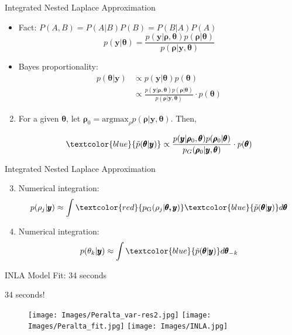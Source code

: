 \documentclass{beamer}
\begin{document}
\begin{frame}{Integrated Nested Laplace Approximation} {\citep{Rue2009}}
\begin{itemize}
\item Fact: $P(A,B) = P(A|B) P(B) = P(B|A) P(A)$
$$ p(\pmb{y} | \pmb{\theta}) = \frac{p(\pmb{y} | \pmb{\rho}, \pmb{\theta}) p(\pmb{\rho} | \pmb{\theta})} {p(\pmb{\rho} | \pmb{y}, \pmb{\theta})} $$
\item Bayes proportionality:
    \begin{align}
    p(\pmb{\theta}|\pmb{y}) & \propto p(\pmb{y}|\pmb{\theta})p(\pmb{\theta}) \nonumber \\
    & \propto \frac{p(\pmb{y} | \pmb{\rho}, \pmb{\theta}) p(\pmb{\rho} | \pmb{\theta})}{p(\pmb{\rho} | \pmb{y}, \pmb{\theta})} \cdot p(\pmb{\theta}) \nonumber
    \end{align}
\end{itemize}

\begin{enumerate}
\setcounter{enumi}{1}
\item For a given $\pmb{\theta}$, let $\pmb{\rho}_{0} = \text{argmax}_{\rho}p(\pmb{\rho}|\pmb{y},\pmb{\theta})$. Then,

$$ \textcolor{blue}{\tilde{p}(\pmb{\theta}|\pmb{y})}  \propto  \frac{p(\pmb{y} | \pmb{\rho}_{0}, \pmb{\theta}) p(\pmb{\rho}_{0} | \pmb{\theta})}{p_{G}(\pmb{\rho}_{0} | \pmb{y}, \pmb{\theta})} \cdot p(\pmb{\theta}) $$


\end{enumerate}
\end{frame}

\begin{frame}{Integrated Nested Laplace Approximation} {\citep{Rue2009}}
\begin{enumerate}
\setcounter{enumi}{2}
\item Numerical integration:
        $$ p(\rho_{j} | \pmb{y}) \approx \int \textcolor{red}{p_{\text{G}}(\rho_{j}|\pmb{\theta, y})} \textcolor{blue}{\tilde{p}(\pmb{\theta}|\pmb{y})} d\pmb{\theta} $$
\item Numerical integration:
$$ p(\theta_{k} | \pmb{y}) \approx \int \textcolor{blue}{\tilde{p}(\pmb{\theta}|\pmb{y})} d\pmb{\theta}_{-k} $$
\end{enumerate}
\end{frame}


\begin{frame}{INLA Model Fit: 34 seconds}{}
\begin{center}
\huge{34 seconds!}
\end{center}
  \begin{figure}[H]
	\centering
	\texttt{[image: Images/Peralta\_var-res2.jpg]}
	\texttt{[image: Images/Peralta\_fit.jpg]}
	\texttt{[image: Images/INLA.jpg]}
	\end{figure}
\end{frame}
\end{document}
